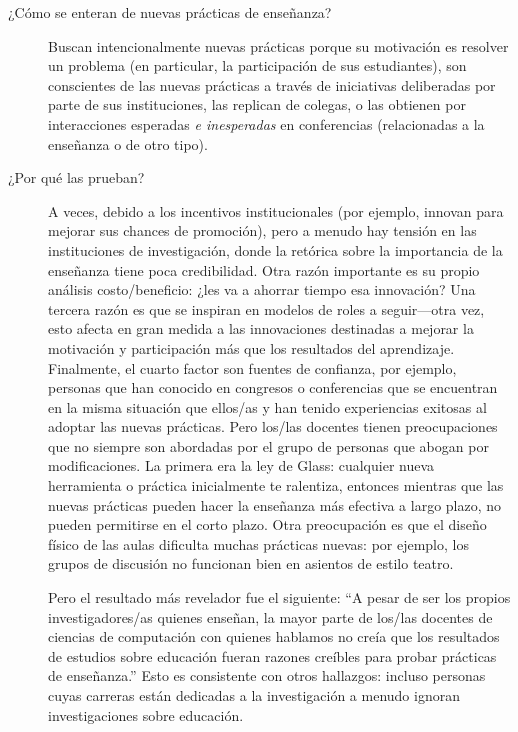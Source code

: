 \begin{description}


\item[¿Cómo se enteran de nuevas prácticas de enseñanza?]

Buscan intencionalmente nuevas prácticas
porque su motivación es  resolver un problema (en particular, la participación de sus estudiantes),
son conscientes de las nuevas prácticas a través de iniciativas deliberadas por parte de sus instituciones,
las replican de colegas,
o las obtienen por interacciones esperadas  \emph{e inesperadas} en conferencias
(relacionadas a la enseñanza o de otro tipo).

\item[¿Por qué las prueban?]

A veces, debido a los incentivos institucionales
(por ejemplo, innovan para mejorar sus chances de promoción),
pero a menudo hay tensión en las instituciones de investigación,
donde la retórica sobre la importancia de la enseñanza tiene poca credibilidad.
Otra razón importante es su propio análisis costo/beneficio:
¿les va a ahorrar tiempo esa innovación?
Una tercera razón es que se inspiran en modelos de roles a seguir---otra vez,
esto afecta en gran medida a las innovaciones destinadas a  mejorar la motivación y participación más que los resultados del aprendizaje.
Finalmente, el cuarto factor son fuentes de confianza,
por ejemplo, personas que han conocido en congresos o conferencias que se encuentran en la misma situación que ellos/as 
y han tenido experiencias exitosas al adoptar las nuevas prácticas.
Pero los/las docentes tienen preocupaciones que no siempre son abordadas por el grupo de personas que abogan por modificaciones.
La primera era la ley de Glass:
cualquier nueva herramienta o práctica inicialmente te ralentiza,
entonces mientras que las nuevas prácticas pueden hacer la enseñanza más efectiva a largo plazo, no pueden permitirse en el corto plazo.
Otra preocupación es que el diseño físico de las aulas dificulta muchas prácticas nuevas:
por ejemplo,
los grupos de discusión no funcionan bien en asientos de estilo teatro.

Pero el resultado más revelador fue el siguiente:
``A pesar de ser los propios investigadores/as quienes enseñan,
la mayor parte de los/las docentes de ciencias de computación con quienes hablamos
no creía que los resultados de estudios sobre educación fueran razones creíbles para probar prácticas de enseñanza.''
Esto es consistente con otros hallazgos:
incluso personas cuyas carreras están dedicadas a la investigación a menudo ignoran investigaciones sobre educación. 


\end{description}
